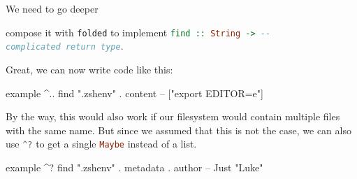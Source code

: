 \documentclass{exercise}
\newcommand\h[2][]{\lstinline[language=haskell,#1]{#2}}
\begin{document}
\begin{exercise}{We need to go deeper}
\begin{tasks}[resume*]
				compose it with \h{folded} to implement \h{find :: String -> --
				complicated return type}.
		\end{tasks}
		Great, we can now write code like this:
		\begin{haskell}
example ^.. find ".zshenv" . content
-- ["export EDITOR=e"]
		\end{haskell}
		By the way, this would also work if our filesystem would contain multiple files
		with the same name. But since we assumed that this is not the case, we can also
		use \h{^?} to get a single \h{Maybe} instead of a list.
		\begin{haskell}
example ^? find ".zshenv" . metadata . author
-- Just "Luke"
		\end{haskell}
	\end{exercise}
\end{document}
